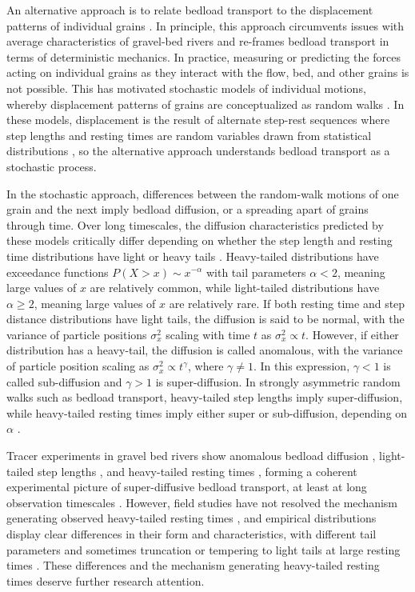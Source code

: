 \documentclass[draft]{agujournal2018}
\begin{document}
An alternative approach is to relate bedload transport to the displacement patterns of individual grains \citep[e.g.][]{Hassan2013}.
In principle, this approach circumvents issues with average characteristics of gravel-bed rivers and re-frames bedload transport in terms of deterministic mechanics.
In practice, measuring or predicting the forces acting on individual grains as they interact with the flow, bed, and other grains is not possible.
This has motivated stochastic models of individual motions, whereby displacement patterns of grains are conceptualized as random walks \citep[e.g.][]{Weiss1994}.
In these models, displacement is the result of alternate step-rest sequences where step lengths and resting times are random variables drawn from statistical distributions \citep{Einstein1937, Yano1969, Nakagawa1976, Hassan1991, Bradley2012}, so the alternative approach understands bedload transport as a stochastic process.

In the stochastic approach, differences between the random-walk motions of one grain and the next imply bedload diffusion, or a spreading apart of grains through time.
Over long timescales, the diffusion characteristics predicted by these models critically differ depending on whether the step length and resting time distributions have light or heavy tails \citep[e.g.][]{Weeks1998}.
Heavy-tailed distributions have exceedance functions $P(X>x) \sim x^{-\alpha}$ with tail parameters $\alpha < 2$, meaning large values of $x$ are relatively common, while light-tailed distributions have $\alpha \geq 2$, meaning large values of $x$ are relatively rare.
If both resting time and step distance distributions have light tails, the diffusion is said to be normal, with the variance of particle positions $\sigma_x^2$
scaling with time $t$ as $\sigma_x^2 \propto t$.
However, if either distribution has a heavy-tail, the diffusion is called anomalous, with the variance of particle position scaling as $\sigma_x^2 \propto t^\gamma$, where $\gamma\neq 1$.
In this expression, $\gamma <1$ is called sub-diffusion and $\gamma > 1$ is super-diffusion.
In strongly asymmetric random walks such as bedload transport, heavy-tailed step lengths imply super-diffusion, while heavy-tailed resting times imply either super or sub-diffusion, depending on $\alpha$ \citep{Weeks1996, Weeks1998,Bradley2017}.

Tracer experiments in gravel bed rivers show anomalous bedload diffusion \citep{Phillips2013, Bradley2017}, light-tailed step lengths \citep{Bradley2012, Hassan2013}, and heavy-tailed resting times \citep{Voepel2013, Olinde2015, Pretzlav2016, Bradley2017}, forming a coherent experimental picture of super-diffusive bedload transport, at least at long observation timescales \citep[e.g.][]{Nikora2002, Martin2012}.
However, field studies have not resolved the mechanism generating observed heavy-tailed resting times \citep[e.g.][]{Bradley2017}, and empirical distributions display clear differences in their form and characteristics, with different tail parameters \citep[e.g.][]{Olinde2015} and sometimes truncation \citep[e.g.][]{Bradley2017} or tempering to light tails at large resting times \citep[e.g.][]{Voepel2013}.
These differences and the mechanism generating heavy-tailed resting times deserve further research attention.
\end{document}

